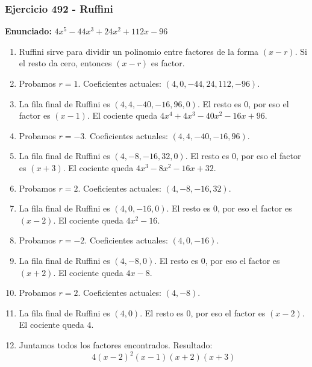 \documentclass[11pt,a4paper]{article}
\begin{document}
\subsubsection*{Ejercicio 492 - Ruffini}
\textbf{Enunciado:} $ 4 x^{5} - 44 x^{3} + 24 x^{2} + 112 x - 96 $\par
\begin{enumerate}[leftmargin=2em]
\item Ruffini sirve para dividir un polinomio entre factores de la forma \((x-r)\). Si el resto da cero, entonces \((x-r)\) es factor.
\item Probamos \(r=1\). Coeficientes actuales: \((4, 0, -44, 24, 112, -96)\).
\item La fila final de Ruffini es \((4, 4, -40, -16, 96, 0)\). El resto es \(0\), por eso el factor es \((x-1)\). El cociente queda \(4 x^{4} + 4 x^{3} - 40 x^{2} - 16 x + 96\).
\item Probamos \(r=-3\). Coeficientes actuales: \((4, 4, -40, -16, 96)\).
\item La fila final de Ruffini es \((4, -8, -16, 32, 0)\). El resto es \(0\), por eso el factor es \((x+3)\). El cociente queda \(4 x^{3} - 8 x^{2} - 16 x + 32\).
\item Probamos \(r=2\). Coeficientes actuales: \((4, -8, -16, 32)\).
\item La fila final de Ruffini es \((4, 0, -16, 0)\). El resto es \(0\), por eso el factor es \((x-2)\). El cociente queda \(4 x^{2} - 16\).
\item Probamos \(r=-2\). Coeficientes actuales: \((4, 0, -16)\).
\item La fila final de Ruffini es \((4, -8, 0)\). El resto es \(0\), por eso el factor es \((x+2)\). El cociente queda \(4 x - 8\).
\item Probamos \(r=2\). Coeficientes actuales: \((4, -8)\).
\item La fila final de Ruffini es \((4, 0)\). El resto es \(0\), por eso el factor es \((x-2)\). El cociente queda \(4\).
\item Juntamos todos los factores encontrados. Resultado: \[\boxed{4 \left(x - 2\right)^{2} \left(x - 1\right) \left(x + 2\right) \left(x + 3\right)}\]
\end{enumerate}

\vspace{0.2cm}
\end{document}
